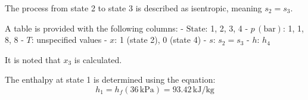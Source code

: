 The process from state 2 to state 3 is described as isentropic, meaning \( s_2 = s_3 \).  

A table is provided with the following columns:  
- \( \text{State} \): 1, 2, 3, 4  
- \( p \, (\text{bar}) \): 1, 1, 8, 8  
- \( T \): unspecified values  
- \( x \): 1 (state 2), 0 (state 4)  
- \( s \): \( s_2 = s_3 \)  
- \( h \): \( h_4 \)  

It is noted that \( x_3 \) is calculated.  

The enthalpy at state 1 is determined using the equation:  
\[
h_1 = h_f(36 \, \text{kPa}) = 93.42 \, \text{kJ/kg}
\]